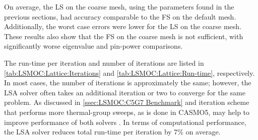 {{{      On average, the \ac{LS} on the coarse mesh, using the parameters found in the previous sections, had accuracy comparable to the \ac{FS} on the default mesh.
      Additionally, the worst case errors were lower for the \ac{LS} on the coarse mesh.
      These results also show that the \ac{FS} on the coarse mesh is not sufficient, with significantly worse eigenvalue and pin-power comparisons.

      The run-time per iteration and number of iterations are listed in \cref{tab:LSMOC:Lattice:Iterations} and \cref{tab:LSMOC:Lattice:Run-time}, respectively.
      In most cases, the number of iterations is approximately the same; however, the \ac{LSA} solver often takes an additional iteration or two to converge for the same problem.
      As discussed in \cref{ssec:LSMOC:C5G7 Benchmark} and iteration scheme that performs more thermal-group sweeps, as is done in CASMO5, may help to improve performance of both solvers \cite{FerrerPersoanlCommunications2018}.
      In terms of computational performance, the \ac{LSA} solver reduces total run-time per iteration by 7\% on average.

}}}

